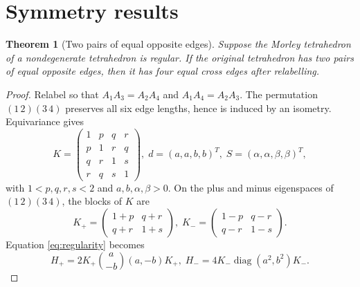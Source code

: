 \documentclass[11pt]{article}
\newtheorem{theorem}{Theorem}[section]
\theoremstyle{definition}
\theoremstyle{remark}
\DeclareMathOperator{\diag}{diag}
\begin{document}
\section{Symmetry results}\label{sec:symmetry}

\begin{theorem}[Two pairs of equal opposite edges]
\label{thm:twopairs}
Suppose the Morley tetrahedron of a nondegenerate tetrahedron is regular. If the original tetrahedron has two pairs of equal opposite edges, then it has four equal cross edges after relabelling.
\end{theorem}

\begin{proof}
Relabel so that $A_1A_3=A_2A_4$ and $A_1A_4=A_2A_3$. The permutation $(1\,2)(3\,4)$ preserves all six edge lengths, hence is induced by an isometry. Equivariance gives
\begin{equation}
K=\begin{pmatrix}1&p&q&r\\p&1&r&q\\q&r&1&s\\r&q&s&1\end{pmatrix},
\; d=(a,a,b,b)^T,\; S=(\alpha,\alpha,\beta,\beta)^T,
\label{eq:twopairsK}
\end{equation}
with $1<p,q,r,s<2$ and $a,b,\alpha,\beta>0$. On the plus and minus eigenspaces of $(1\,2)(3\,4)$, the blocks of $K$ are
\[
K_+=\begin{pmatrix}1+p&q+r\\q+r&1+s\end{pmatrix},
\; K_-=\begin{pmatrix}1-p&q-r\\q-r&1-s\end{pmatrix}.
\]
Equation \eqref{eq:regularity} becomes
\begin{equation}
H_+=2K_+\binom{a}{-b}(a,-b)K_+,
\; H_-=4K_-\diag(a^2,b^2)K_-.
\label{eq:twopairsblocks}
\end{equation}


\end{proof}
\end{document}
